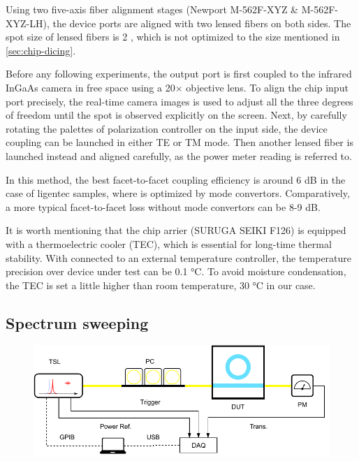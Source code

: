 Using two five-axis fiber alignment stages (Newport M-562F-XYZ \& M-562F-XYZ-LH), the device ports are aligned with two lensed fibers on both sides. The spot size of lensed fibers is 2 \um, which is not optimized to the size mentioned in \autoref{sec:chip-dicing}. 

Before any following experiments, the output port is first coupled to the infrared InGaAs camera in free space using a 20$\times$ objective lens. To align the chip input port precisely, the real-time camera images is used to adjust all the three degrees of freedom until the spot is observed explicitly on the screen. Next, by carefully rotating the palettes of polarization controller on the input side, the device coupling can be launched in either TE or TM mode. Then another lensed fiber is launched instead and aligned carefully, as the power meter reading is referred to.

In this method, the best facet-to-facet coupling efficiency is around 6 dB in the case of ligentec samples, where is optimized by mode convertors. Comparatively, a more typical facet-to-facet loss without mode convertors can be 8-9 dB.

It is worth mentioning that the chip arrier (SURUGA SEIKI F126) is equipped with a thermoelectric cooler (TEC), which is essential for long-time thermal stability. 
With connected to an external temperature controller, the temperature precision over device under test can be 0.1 \si{\celsius}.
To avoid moisture condensation, the TEC is set a little higher than room temperature, 30 \si{\celsius} in our case. 

\subsection{Spectrum sweeping}

\begin{figure}
	\centering
	\includegraphics[width=1\textwidth]{imgs/trans.pdf}
	\label{fig:transsetup}
\end{figure}

